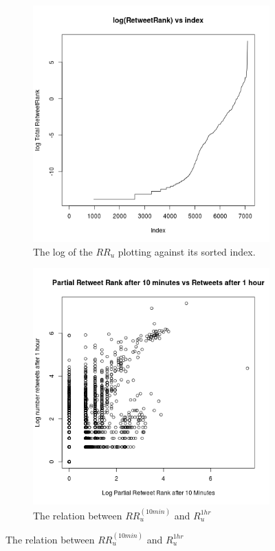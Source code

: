 \begin{figure}
  \centering
\begin{subfigure}[b]{0.45\textwidth}
   \includegraphics[width=\textwidth]{../src/Analysis/retweetrankcurve.png}
   \caption{The log of the $RR_u$ plotting against its sorted index.}
   \label{fig:rtrate}  
\end{subfigure}%
\begin{subfigure}[b]{0.45\textwidth}
   \includegraphics[width=\textwidth]{../src/Analysis/partialrtr.png}
   \caption{The relation between $RR_u^{(10min)}$ and $R_u^{1hr}$}
   \label{fig:partialpair}  
\end{subfigure}
\end{figure}
